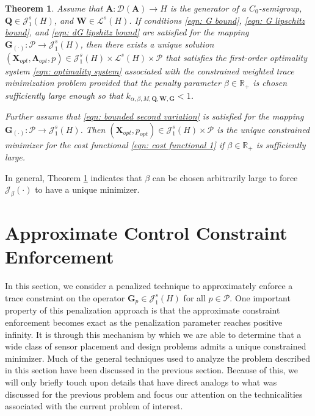 \documentclass{amsart}
\newcommand{\sL}{\mathscr L}
\newcommand{\sJ}{\mathscr J}
\newcommand{\p}[1]{\left( {#1} \right)}
\newcommand{\sP}{\mathcal{P}}
\newcommand{\bA}{\mathbf A}
\newcommand{\bX}{\mathbf X}
\newcommand{\bQ}{\mathbf Q}
\newcommand{\bG}{\mathbf G}
\newcommand{\bLambda}{\boldsymbol{\Lambda}}
\newcommand{\bW}{\mathbf W}
\newtheorem{theorem}{Theorem}
\begin{document}
\begin{theorem} \label{theorem: well-posedness problem 1}
Assume that $\bA: \mathcal D(\bA) \rightarrow H$ is the generator of a $C_0$-semigroup, $\bQ \in \sJ_1^s(H)$, and $\bW \in \sL^s(H)$. If conditions \eqref{eqn: G bound}, \eqref{eqn: G lipschitz bound}, and \eqref{eqn: dG lipshitz bound} are satisfied for the mapping $\bG_{(\cdot)}: \sP \rightarrow \sJ_1^s(H)$, then there exists a unique solution $\p{\bX_{opt}, \bLambda_{opt}, p} \in \sJ_1^s(H) \times \sL^s\p{H} \times \sP$ that satisfies the first-order optimality system \eqref{eqn: optimality system} associated with the constrained weighted trace minimization problem provided that the penalty parameter $\beta\in\mathbb R_+$ is chosen sufficiently large enough so that $k_{\alpha, \beta, M, \bQ, \bW, \bG} < 1$.

Further assume that \eqref{eqn: bounded second variation} is satisfied for the mapping $\bG_{(\cdot)}: \sP \rightarrow \sJ_1^s(H)$. Then $\p{\bX_{opt}, p_{opt}} \in \sJ_1^s(H)\times \sP$ is the unique constrained minimizer for the cost functional \eqref{eqn: cost functional 1} if $\beta \in \mathbb R_+$ is sufficiently large. 
\end{theorem}

In general, Theorem \ref{theorem: well-posedness problem 1} indicates that $\beta$ can be chosen arbitrarily large to force $\mathcal J_\beta(\cdot)$ to have a unique minimizer. 

\section{Approximate Control Constraint Enforcement}
\label{sec: problem 2}
In this section, we consider a penalized technique to approximately enforce a trace constraint on the operator $\bG_p \in \sJ_1^s(H)$ for all $p \in \sP$. One important property of this penalization approach is that the approximate constraint enforcement becomes exact as the penalization parameter reaches positive infinity. It is through this mechanism by which we are able to determine that a wide class of sensor placement and design problems admits a unique constrained minimizer. Much of the general techniques used to analyze the problem described in this section have been discussed in the previous section. Because of this, we will only briefly touch upon details that have direct analogs to what was discussed for the previous problem and focus our attention on the technicalities associated with the current problem of interest.
\end{document}

